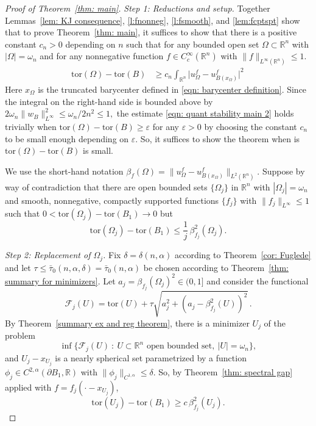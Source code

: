 \documentclass[10pt, reqno]{amsart}
\numberwithin{equation}{section}
\def\R{{\mathbb R}}
\def\e{\varepsilon}
\def\W{\Omega}
\def\om{\omega}
\def\tor{\mathrm{tor}}
\begin{document}
\begin{proof}[Proof of Theorem~\ref{thm: main}]

 {\it Step 1: Reductions and setup.}
Together Lemmas~\ref{lem: KJ consequence}, \ref{l:fnonneg}, \ref{l:fsmooth}, and \ref{lem:fcptspt} show that to prove Theorem~\ref{thm: main}, it suffices to show that there is a positive constant $c_{n}>0$ depending on $n$ such that for any bounded open set $\W \subset \R^n$ with $|\W| = \omega_n$ and for any nonnegative function $f \in C^\infty_c(\R^n)$ with $\|f\|_{L^{\infty}(\R^n)}\leq 1$.
\begin{align}
\label{eqn: quant stability main 2}
\tor(\W ) - \tor(B)  & \geq c_{n}\int_{\R^n} \big|u_{\W}^f - u_{B(x_\W)}^f\big|^2 \,
\end{align}
Here $x_\W$ is the truncated  barycenter defined in \eqref{eqn: barycenter definition}. Since the integral on the right-hand side is bounded above by $2\om_n\|w_B\|_{L^\infty}^2 \leq \om_n/2n^2 \leq 1,$ the estimate \eqref{eqn: quant stability main 2} holds trivially when $\tor(\W ) - \tor(B)\geq \e$ for any $\e>0$ by choosing the constant $c_{n}$ to be small enough depending on $\e$. So, it suffices to show the theorem when  is  $\tor(\W ) - \tor(B)$ is small.

We use the short-hand notation $\beta_f(\W) = \| u_\W^f - u_{B(x_\W)}^f\|_{L^2(\R^n)}$. 	Suppose by way of contradiction that there are open bounded sets $\{\W_j\}$ in $\R^n$ with $|\W_j| = \omega_n$ and  smooth, nonnegative, compactly supported functions  $\{f_j\}$ with $\| f_j\|_{L^{\infty}}\leq 1$ such that $0< \tor(\W_j)-\tor(B_1)\to 0$ but 
	\begin{equation}\label{e: sp contra}
		\tor(\W_j ) - \tor(B_1) \leq \frac{1}{j}\, \beta_{f_j}^2(\W_j). 
	\end{equation}



 {\it Step 2: Replacement of $\W_j$.}
Fix $\delta = \delta(n, \alpha)$ according to Theorem~\ref{cor: Fuglede} and let $\tau \leq  \bar{\tau}_0(n,\alpha,\delta) = \bar{\tau}_0(n,\alpha)$ be chosen according to Theorem~\ref{thm: summary for minimizers}.  Let $a_j = \beta_{f_j}(\W_j)^2 \in (0, 1]$ and consider the functional
	\[
\mathcal{F}_j(U) =	\tor(U) + \tau \sqrt{a_j^2 + (a_j -\beta^2_{f_j}(U))^2}\,.
	\]
By Theorem~\ref{summary ex and reg theorem}, there is a minimizer  $U_j$ of the problem
    	\begin{equation}
		\inf \{ \mathcal{F}_j(U) \ : \ U \subset \R^n \text{ open bounded set}, \ |U| = \omega_n\},
	\end{equation} 
and $U_j -x_{U_j}$ is a nearly spherical set parametrized by a function $\phi_j \in C^{2,\alpha}( \partial B_1, \R)$ with $\|\phi_j\|_{C^{1,\alpha}}\leq \delta.$ So, by Theorem~\ref{thm: spectral gap} applied with $f = f_j(\cdot -x_{U_j})$, 
	\begin{equation}\label{eqn: sp fuglede}
		\tor(U_j ) - \tor(B_1) \geq c\, \beta_{f_j}^2(U_j). 
	\end{equation}


\end{proof}
\end{document}
